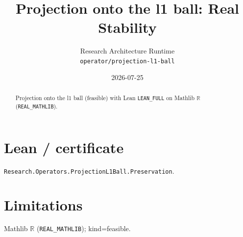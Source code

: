 \documentclass[11pt]{article}
\title{Projection onto the l1 ball: Real Stability}
\author{Research Architecture Runtime \\ \texttt{operator/projection-l1-ball}}
\date{2026-07-25}
\begin{document}
\maketitle
\begin{abstract}
Projection onto the l1 ball (feasible) with Lean \texttt{LEAN\_FULL} on Mathlib $\mathbb{R}$ (\texttt{REAL\_MATHLIB}).
\end{abstract}
\section{Lean / certificate}
\texttt{Research.Operators.ProjectionL1Ball.Preservation}.
\section{Limitations}
Mathlib $\mathbb{R}$ (\texttt{REAL\_MATHLIB}); kind=feasible.
\end{document}
